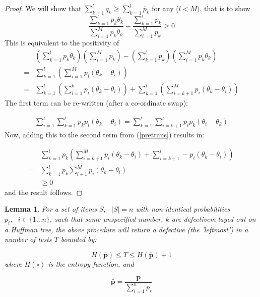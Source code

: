 \documentclass[11pt]{article}
\renewcommand{\vec}[1]{\mathbf{#1}}
\newtheorem{lem}{Lemma}[section]
\begin{document}
\begin{proof}

We will show that \(\sum_{k=1}^l q_k \geq \sum_{k=1}^l \bar{p}_k\) for any (\(l<M)\), that is to show
\begin{equation}
\frac{\sum_{k=1}^l p_k\theta_k}{\sum_{i=1}^M p_k\theta_k} - \frac{\sum_{k=1}^l p_k}{\sum_{i=1}^M p_k} \geq 0
\end{equation}
This is equivalent to the positivity of 
\begin{align}
& \left(\sum_{k=1}^l p_k\theta_k\right)\left(\sum_{i=1}^M p_k\right) - \left(\sum_{k=1}^l p_k\right)\left(\sum_{i=1}^M p_k\theta_k\right) \\
=& \sum_{k=1}^l \left(\sum_{i=1}^M p_i\left(\theta_k - \theta_i\right)\right) \\
=& \sum_{k=1}^l \left(\sum_{i=1}^k p_i\left(\theta_k - \theta_i\right)\right) + \sum_{k=1}^l\left(\sum_{i=k+1}^M p_i\left(\theta_k-\theta_i\right)\right) \label{pretrans}
\end{align}
The first term can be re-written (after a co-ordinate swap):

\begin{align}
\sum_{i=1}^l \sum_{k=1}^l p_k p_i \left(\theta_k - \theta_i\right) = \sum_{k=1}^l \sum_{i=k+1}^l p_i p_k \left(\theta_i - \theta_k\right) 
\end{align}
Now, adding this to the second term from (\ref{pretrans}) results in:

\begin{align}
&\sum_{k=1}^l p_k \left(\sum_{i=k+1}^M p_i\left(\theta_k - \theta_i\right) + \sum_{i=k+1}^l -p_i\left(\theta_k - \theta_i\right)\right) \\
=& \sum_{k=1}^l p_k \sum_{l+1}^M p_i\left(\theta_k - \theta_i\right) \\
&\geq 0
\end{align}
and the result follows.
\end{proof}

\begin{lem}
For a set of items \(S, \text{ } \lvert S \rvert = n\) with non-identical probabilities \(p_i, \text{ } i \in \{1\ldots n\} \), such that some unspecified number, \(k\) are defectivem layed out on a Huffman tree, the above procedure will return a defective (the 'leftmost') in a number of tests \(T\) bounded by:

\begin{equation}
H\left(\vec{\bar{p}}\right) \leq T \leq H\left(\vec{\bar{p}}\right) + 1
\end{equation}
where \( H\left( \circ \right) \) is the entropy function, and

\begin{equation}
\vec{\bar{p}} = \frac{\vec{p}}{\sum_{i=1}^n p_i}
\end{equation}
\end{lem}
\end{document}
